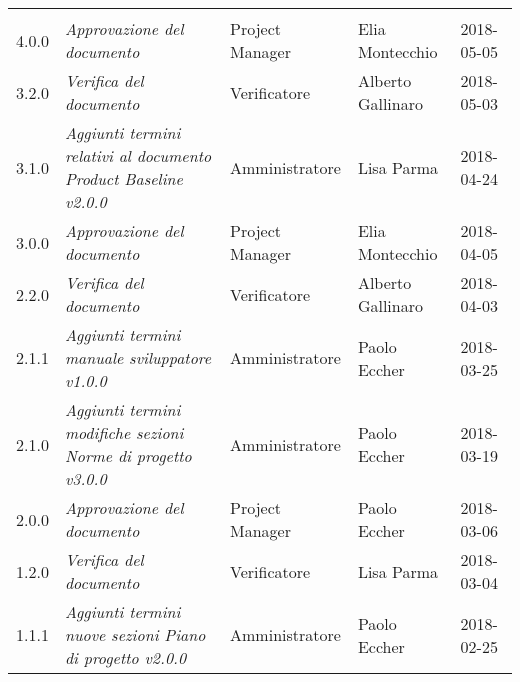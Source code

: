 \newpage 
\section*{}
\begin{table}[H]
	\centering
	\begin{tabular}{C{2cm}|C{4cm}|C{3cm}|C{3cm}|R{2cm}}
		
		  &  & &  & \\
		
		
		4.0.0 & \emph{Approvazione del documento} & Project Manager & Elia Montecchio & 2018-05-05  \\
		\hline
		
		3.2.0 & \emph{Verifica del documento} & Verificatore & Alberto Gallinaro & 2018-05-03  \\
		\hline
		
		3.1.0 & \emph{Aggiunti termini relativi al documento Product Baseline v2.0.0 } & Amministratore & Lisa Parma & 2018-04-24  \\
		\hline
		
		3.0.0 & \emph{Approvazione del documento} & Project Manager & Elia Montecchio & 2018-04-05  \\
		\hline
		
		2.2.0 & \emph{Verifica del documento} & Verificatore & Alberto Gallinaro & 2018-04-03  \\
		\hline
		
		2.1.1 & \emph{Aggiunti termini manuale sviluppatore v1.0.0} & Amministratore & Paolo Eccher & 2018-03-25  \\
		\hline
		
		2.1.0 & \emph{Aggiunti termini modifiche sezioni Norme di progetto v3.0.0} & Amministratore &  Paolo Eccher & 2018-03-19  \\
		\hline
		
		2.0.0 & \emph{Approvazione del documento} & Project Manager & Paolo Eccher & 2018-03-06  \\
		\hline
		
		1.2.0 & \emph{Verifica del documento} & Verificatore & Lisa Parma & 2018-03-04  \\
		\hline
		
		1.1.1 & \emph{Aggiunti termini nuove sezioni Piano di progetto v2.0.0} & Amministratore & Paolo Eccher & 2018-02-25  \\
		\hline
		

\end{tabular}
\end{table}
